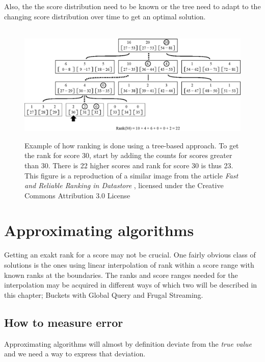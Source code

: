 Also, the the score distribution need to be known or the tree need to adapt to the changing score distribution over time to get an optimal solution.

\begin{figure}[h!]
  \centering
  \caption{Example of how ranking is done using a tree-based approach. To get the rank for score 30, start by adding the counts for scores greater than 30. There is 22 higher scores and rank for score 30 is thus 23.\\This figure is a reproduction of a similar image from the article \emph{Fast and Reliable Ranking in Datastore} \cite{ranking-in-datastore} 
 , licensed under the Creative Commons Attribution 3.0 License}   \label{fig:tree}
\hbox{\hspace{-0.8cm}
  \includegraphics[width=15cm]{img/tree.eps}}
\end{figure}


\section{Approximating algorithms}


Getting an exakt rank for a score may not be crucial. One fairly obvious class of solutions is the ones using linear interpolation of rank within a score range with known ranks at the boundaries. The ranks and score ranges needed for the interpolation may be acquired in different ways of which two will be described in this chapter; Buckets with Global Query and Frugal Streaming.

\subsection{How to measure error}

Approximating algorithms will almost by definition deviate from the \emph{true value} and we need a way to express that deviation.

